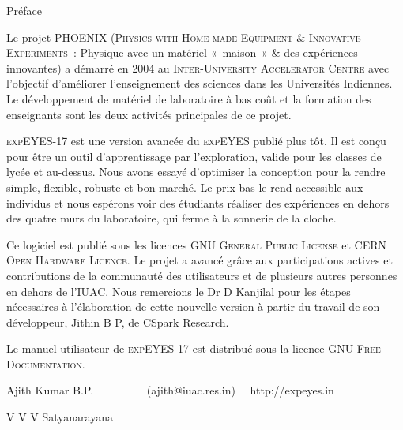 \documentclass[12pt,a4paper]{report}
\begin{document}
\thispagestyle{empty}

Préface

Le projet PHOENIX (\textsc{Physics with Home-made Equipment \& Innovative
Experiments}~: Physique avec un matériel «~maison~» \& des expériences
innovantes) a démarré en 2004 au \textsc{Inter-University Accelerator
Centre} avec l'objectif d'améliorer l'enseignement des sciences dans
les Universités Indiennes. Le développement de matériel de laboratoire
à bas coût et la formation des enseignants sont les deux activités
principales de ce projet.

\textsc{expEYES-17} est une version avancée du \textsc{expEYES} publié
plus tôt. Il est conçu pour être un outil d'apprentissage par l'exploration,
valide pour les classes de lycée et au-dessus. Nous avons essayé d'optimiser
la conception pour la rendre simple, flexible, robuste et bon marché.
Le prix bas le rend accessible aux individus et nous espérons voir
des étudiants réaliser des expériences en dehors des quatre murs du
laboratoire, qui ferme à la sonnerie de la cloche.

Ce logiciel est publié sous les licences \textsc{GNU General Public
License} et \textsc{CERN Open Hardware Licence}. Le projet a avancé
grâce aux participations actives et contributions de la communauté
des utilisateurs et de plusieurs autres personnes en dehors de l'\textsc{IUAC}.
Nous remercions le Dr D Kanjilal pour les étapes nécessaires à l'élaboration
de cette nouvelle version à partir du travail de son développeur,
Jithin B P, de CSpark Research.

Le manuel utilisateur de \textsc{expEYES-17} est distribué sous la
licence \textsc{GNU Free Documentation}.

Ajith Kumar B.P. ~~~~~~~~~(ajith@iuac.res.in) ~~http://expeyes.in

V V V Satyanarayana
\end{document}
